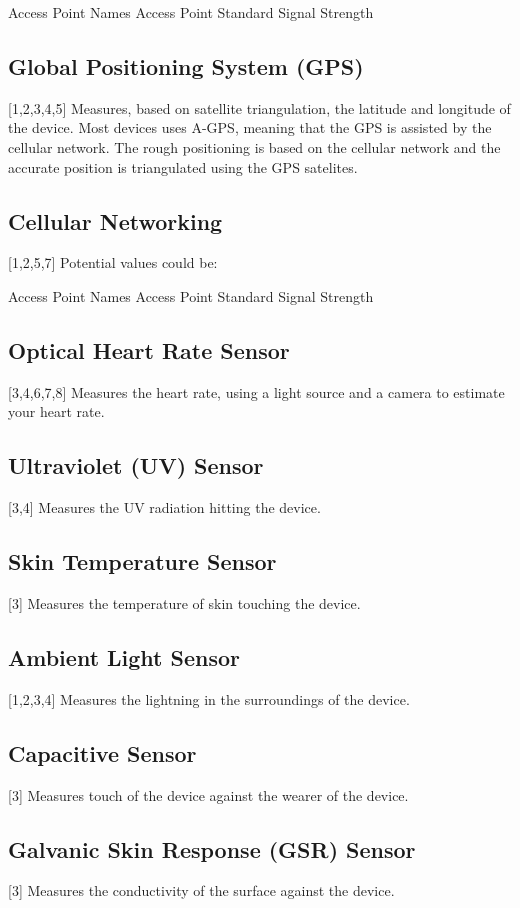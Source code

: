 Access Point Names
Access Point Standard
Signal Strength

\subsection{Global Positioning System (GPS)}
\label{sub:gps}
[1,2,3,4,5]
Measures, based on satellite triangulation,  the latitude and longitude of the device. Most devices uses A-GPS, meaning that the GPS is assisted by the cellular network. The rough positioning is based on the cellular network and the accurate position is triangulated using the GPS satelites.

\subsection{Cellular Networking}
\label{sub:cellular_networking}
[1,2,5,7]
Potential values could be: 

Access Point Names
Access Point Standard
Signal Strength


\subsection{Optical Heart Rate Sensor}
\label{sub:optical_heart_rate_sensor}
[3,4,6,7,8]
Measures the heart rate, using a light source and a camera to estimate your heart rate.

\subsection{Ultraviolet (UV) Sensor}
\label{sub:uv_sensor}
[3,4]
Measures the UV radiation hitting the device.

\subsection{Skin Temperature Sensor}
\label{sub:skin_temperature_sensor}
[3]
Measures the temperature of skin touching the device.

\subsection{Ambient Light Sensor}
\label{sub:ambient_light_sensor}
[1,2,3,4]
Measures the lightning in the surroundings of the device.

\subsection{Capacitive Sensor}
\label{sub:capacitive_sensor}
[3]
Measures touch of the device against the wearer of the device.

\subsection{Galvanic Skin Response (GSR) Sensor}
\label{sub:galvanic_skin_respons_}
[3]
Measures the conductivity of the surface against the device.
